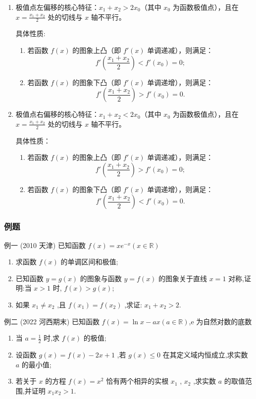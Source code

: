 \documentclass{article}
\begin{document}
\begin{enumerate}
    \item 极值点左偏移的核心特征：$x_1 + x_2 > 2x_0$（其中 $x_0$ 为函数极值点），且在 $x = \frac{x_1 + x_2}{2}$ 处的切线与 $x$ 轴不平行。

具体性质:
\begin{enumerate}
    \item 若函数 $f(x)$ 的图象上凸（即 $f'(x)$ 单调递减），则满足：
    \[
    f'\left(\frac{x_1 + x_2}{2}\right) < f'(x_0) = 0;
    \]
    \item 若函数 $f(x)$ 的图象下凸（即 $f'(x)$ 单调递增），则满足：
    \[
    f'\left(\frac{x_1 + x_2}{2}\right) > f'(x_0) = 0.
    \]
\end{enumerate}

   \item  极值点右偏移的核心特征：$x_1 + x_2 < 2x_0$（其中 $x_0$ 为函数极值点），且在 $x = \frac{x_1 + x_2}{2}$ 处的切线与 $x$ 轴不平行。

具体性质：
\begin{enumerate}
    \item 若函数 $f(x)$ 的图象上凸（即 $f'(x)$ 单调递减），则满足：
    \[
    f'\left(\frac{x_1 + x_2}{2}\right) > f'(x_0) = 0;
    \]
    \item 若函数 $f(x)$ 的图象下凸（即 $f'(x)$ 单调递增），则满足：
    \[
    f'\left(\frac{x_1 + x_2}{2}\right) < f'(x_0) = 0.
    \]
\end{enumerate}
\end{enumerate}
\newpage
\subsubsection{例题}

例一 (2010 天津) 已知函数 $f(x)=x e^{-x}(x \in \mathbb{R})$
\begin{enumerate}
\item[(1)] 求函数 $f(x)$ 的单调区间和极值;
\item[(2)] 已知函数 $y=g(x)$ 的图象与函数 $y=f(x)$ 的图象关于直线 $x=1$ 对称,证明:当 $x>1$ 时, $f(x)>g(x)$;
\item[(3)] 如果 $x_1 \neq x_2$ ,且 $f(x_1)=f(x_2)$ ,求证: $x_1+x_2>2$.
\end{enumerate}
\vspace{20\baselineskip}

例二 (2022 河西期末) 已知函数 $f(x)=\ln x-a x(a \in \mathbb{R})$,e 为自然对数的底数
\begin{enumerate}
\item[(1)] 当 $a=\frac{1}{2}$ 时,求 $f(x)$ 的极值;
\item[(2)] 设函数 $g(x)=f(x)-2 x+1$ ,若 $g(x) \leq0$ 在其定义域内恒成立,求实数 $a$ 的最小值;
\item[(3)] 若关于 $x$ 的方程 $f(x)=x^2$ 恰有两个相异的实根 $x_1$ , $x_2$ ,求实数 $a$ 的取值范围,并证明 $x_1 x_2>1$.
\end{enumerate}
\vspace{20\baselineskip}
\end{document}
